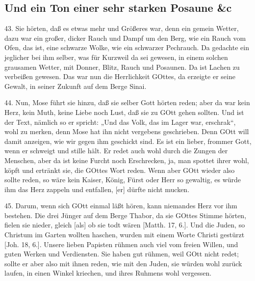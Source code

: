 \subsection{Und ein Ton einer sehr starken Posaune \&c}

43. Sie hörten, daß es etwas mehr und Größeres war, denn ein gemein Wetter, dazu war ein großer, dicker Rauch und Dampf um den Berg, wie ein Rauch vom Ofen, das ist, eine schwarze Wolke, wie ein schwarzer Pechrauch. Da gedachte ein jeglicher bei ihm selber, was für Kurzweil da sei gewesen, in einem solchen grausamen Wetter, mit Donner, Blitz, Rauch und Posaunen. Da ist Lachen zu verbeißen gewesen. Das war nun die Herrlichkeit GOttes, da erzeigte er seine Gewalt, in seiner Zukunft auf dem Berge Sinai.

44. Nun, Mose führt sie hinzu, daß sie selber Gott hörten reden; aber da war kein Herz, kein Muth, keine Liebe noch Lust, daß sie zu GOtt gehen sollten. Und ist der Text, nämlich so er spricht: „Und das Volk, das im Lager war, erschrak“, wohl zu merken, denn Mose hat ihn nicht vergebens geschrieben. Denn GOtt will damit anzeigen, wie wir gegen ihm geschickt sind. Es ist ein lieber, frommer Gott, wenn er schweigt und stille hält. Er redet auch wohl durch die Zungen der Menschen, aber da ist keine Furcht noch Erschrecken, ja, man spottet ihrer wohl, köpft und ertränkt sie, die GOttes Wort reden. Wenn aber GOtt wieder also sollte reden, so wäre kein Kaiser, König, Fürst oder Herr so gewaltig, es würde ihm das Herz zappeln und entfallen, [er] dürfte nicht mucken.

45. Darum, wenn sich GOtt einmal läßt hören, kann niemandes Herz vor ihm bestehen. Die drei Jünger auf dem Berge Thabor, da sie GOttes Stimme hörten, fielen sie nieder, gleich [als] ob sie todt wären [Matth. 17, 6.]. Und die Juden, so Christum im Garten wollten haschen, wurden mit einem Worte Christi gestürzt [Joh. 18, 6.]. Unsere lieben Papisten rühmen auch viel vom freien Willen, und guten Werken und Verdiensten. Sie haben gut rühmen, weil GOtt nicht redet; sollte er aber also mit ihnen reden, wie mit den Juden, sie würden wohl zurück laufen, in einen Winkel kriechen, und ihres Ruhmens wohl vergessen.

